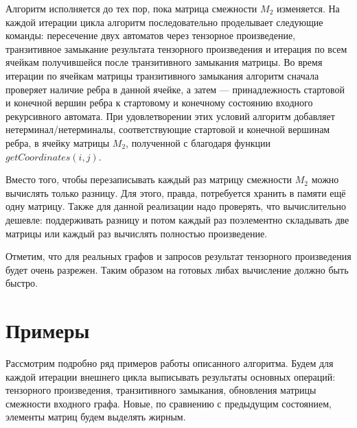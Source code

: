 Алгоритм исполняется до тех пор, пока матрица смежности $M_2$ изменяется. 
На каждой итерации цикла алгоритм последовательно проделывает следующие команды: пересечение двух автоматов через тензорное произведение, транзитивное замыкание результата тензорного произведения и итерация по всем ячейкам получившейся после транзитивного замыкания матрицы.
Во время итерации по ячейкам матрицы транзитивного замыкания алгоритм сначала проверяет наличие ребра в данной ячейке, а затем --- принадлежность стартовой и конечной вершин ребра к стартовому и конечному состоянию входного рекурсивного автомата. 
При удовлетворении этих условий алгоритм добавляет нетерминал/нетерминалы, соответствующие стартовой и конечной вершинам ребра, в ячейку матрицы $M_2$, полученной с благодаря функции $getCoordinates(i,j)$.


Вместо того, чтобы перезаписывать каждый раз матрицу смежности $M_2$ можно вычислять только разницу.
Для этого, правда, потребуется хранить в памяти ещё одну матрицу.
Также для данной реализации надо проверять, что вычислительно дешевле: поддерживать разницу и потом каждый раз поэлементно складывать две матрицы или каждый раз вычислять полностью произведение.


Отметим, что для реальных графов и запросов результат тензорного произведения будет очень разрежен.
Таким образом на готовых либах вычисление должно быть быстро.

\section{Примеры}

Рассмотрим подробно ряд примеров работы описанного алгоритма. 
Будем для каждой итерации внешнего цикла выписывать результаты основных операций: тензорного произведения, транзитивного замыкания, обновления матрицы смежности входного графа.
Новые, по сравнению с предыдущим состоянием, элементы матриц будем выделять жирным.

